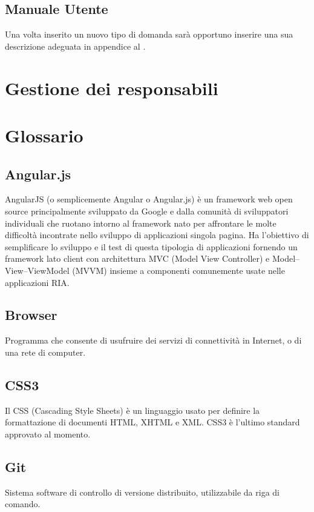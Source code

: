 \documentclass[a4paper, titlepage]{article}
\begin{document}
	\subsection{Manuale Utente}
	Una volta inserito un nuovo tipo di domanda sarà opportuno inserire una sua descrizione adeguata in appendice al .
	
	\newpage
	\section{Gestione dei responsabili}
	
	
	\newpage
	\appendix
	
	\section{Glossario}
	\label{gl} 
	
	\subsection{Angular.js}
	AngularJS (o semplicemente Angular o Angular.js) è un framework web open source principalmente sviluppato da Google e dalla comunità di sviluppatori individuali che ruotano intorno al framework nato per affrontare le molte difficoltà incontrate nello sviluppo di applicazioni singola pagina. Ha l'obiettivo di semplificare lo sviluppo e il test di questa tipologia di applicazioni fornendo un framework lato client con architettura MVC (Model View Controller) e Model–View–ViewModel (MVVM) insieme a componenti comunemente usate nelle applicazioni RIA.
	
	\subsection{Browser}
	Programma che consente di usufruire dei servizi di connettività in Internet, o di una rete di computer.
	
	\subsection{CSS3}
	Il CSS (Cascading Style Sheets) è un linguaggio usato per definire la formattazione di documenti HTML, XHTML e XML. CSS3 è l’ultimo standard approvato al momento.
	
	\subsection{Git}
	Sistema software di controllo di versione distribuito, utilizzabile da riga di comando.
	
\end{document}
